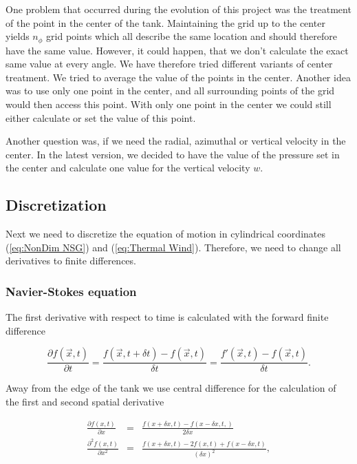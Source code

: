 \documentclass[12pt, a4paper]{article} %
\begin{document}
		One problem that occurred during the evolution of this project was the treatment of the point in the center of the tank. Maintaining the grid up to the center yields $n_\phi$ grid points which all describe the same location and should therefore have the same value. However, it could happen, that we don't calculate the exact same value at every angle. We have therefore tried different variants of center treatment. We tried to average the value of the points in the center. Another idea was to use only one point in the center, and all surrounding points of the grid would then access this point. With only one point in the center we could still either calculate or set the value of this point.
		
		Another question was, if we need the radial, azimuthal or vertical velocity in the center. In the latest version, we decided to have the value of the pressure set in the center and calculate one value for the vertical velocity $w$. 
		
	\subsection{Discretization} %
		Next we need to discretize the equation of motion in cylindrical coordinates (\ref{eq:NonDim NSG}) and (\ref{eq:Thermal Wind}). Therefore, we need to change all derivatives to finite differences. 
		
		\subsubsection{Navier-Stokes equation}
			The first derivative with respect to time is calculated with the forward finite difference
			
			\begin{equation}
				\frac{\partial f(\vec{x}, t)}{\partial t} = \frac{f(\vec{x},t+\delta t) - f(\vec{x}, t)}{\delta t} = \frac{f'(\vec{x},t) - f(\vec{x}, t)}{\delta t} .
				\label{eq:ForwDiv Time}
			\end{equation}
			
			Away from the edge of the tank we use central difference for the calculation of the first and second spatial derivative %
			
			\begin{eqnarray}
				\frac{\partial f(x,t)}{\partial x} &=& \frac{f(x + \delta x,t) - f(x - \delta x,t,)}{2\delta x}
				\label{eq:CentrDiv Space}
				\\
				\frac{\partial^2 f(x,t)}{\partial x^2} &=& \frac{f(x+\delta x,t) - 2f(x,t) + f(x - \delta x,t)}{\left(\delta x\right)^2} ,
				\label{eq:2CentrDiv Space}
			\end{eqnarray}
			
\end{document}
